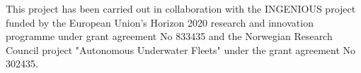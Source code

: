 
This project has been carried out in collaboration with the INGENIOUS project funded by the European Union's Horizon 2020 research and innovation programme under grant agreement No 833435 and the Norwegian Research Council project "Autonomous Underwater Fleets" under the grant agreement No 302435.